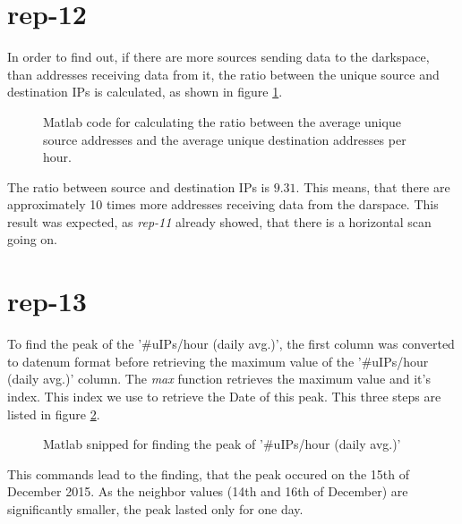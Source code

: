 \section*{rep-12}
In order to find out, if there are more sources sending data to the darkspace, than addresses receiving data from it, the ratio between the unique source and destination IPs is calculated, as shown in figure \ref{fig:ratio_source_destination_ip}.

\begin{figure}[H]

\caption{Matlab code for calculating the ratio between the average unique source addresses and the average unique destination addresses per hour.}
\label{fig:ratio_source_destination_ip}
\end{figure}

The ratio between source and destination IPs is $9.31$. This means, that there are approximately 10 times more addresses receiving data from the darspace. This result was expected, as \textit{rep-11} already showed, that there is a horizontal scan going on.

\section*{rep-13}
To find the peak of the '\#uIPs/hour (daily avg.)', the first column was converted to datenum format before retrieving the maximum value of the '\#uIPs/hour (daily avg.)' column. The \textit{max} function retrieves the maximum value and it's index. This index we use to retrieve the Date of this peak. This three steps are listed in figure \ref{fig:find_peak}.

\begin{figure}[H]

\caption{Matlab snipped for finding the peak of '\#uIPs/hour (daily avg.)'}
\label{fig:find_peak}
\end{figure}

This commands lead to the finding, that the peak occured on the 15th of December 2015. As the neighbor values (14th and 16th of December) are significantly smaller, the peak lasted only for one day.

